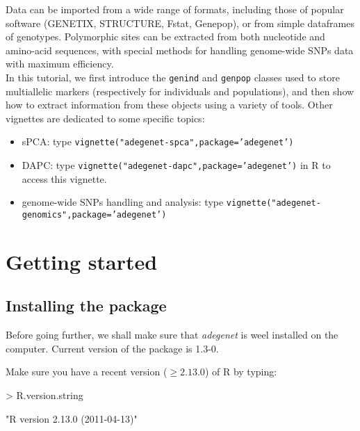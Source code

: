 \documentclass{article}
\begin{document}
Data can be imported from a wide range of formats, including those of
popular software (GENETIX, STRUCTURE, Fstat, Genepop), or from simple dataframes of genotypes.
Polymorphic sites can be extracted from both nucleotide and amino-acid sequences, with special
methods for handling genome-wide SNPs data with maximum efficiency.
\\

In this tutorial, we first introduce the \texttt{genind} and \texttt{genpop} classes used to store
multiallelic markers (respectively for individuals and populations), and then show how to extract
information from these objects using a variety of tools.  Other vignettes are dedicated to some
specific topics:
\begin{itemize}
\item sPCA: type \texttt{vignette("adegenet-spca",package='adegenet')}
\item DAPC: type \texttt{vignette("adegenet-dapc",package='adegenet')} in R to access this vignette.
\item genome-wide SNPs handling and analysis: type \texttt{vignette("adegenet-genomics",package='adegenet')}
\end{itemize}




\section{Getting started}


\subsection{Installing the package}
Before going further, we shall make sure that \textit{adegenet} is weel installed
on the computer.
Current version of the package is 1.3-0.

Make sure you have a recent version ($\geq 2.13.0$) of R by typing:
\begin{Schunk}
\begin{Sinput}
> R.version.string
\end{Sinput}
\begin{Soutput}
[1] "R version 2.13.0 (2011-04-13)"
\end{Soutput}
\end{Schunk}
\end{document}
